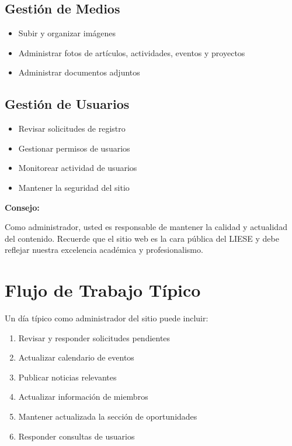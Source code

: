 \documentclass[12pt,letterpaper]{report}
\newenvironment{tip}
    {\begin{mdframed}[linecolor=tip-green,linewidth=2pt,backgroundcolor=tip-green!10]
    \textbf{Consejo:}\par}
    {\end{mdframed}}
\begin{document}
\subsection{Gestión de Medios}
\begin{itemize}
    \item Subir y organizar imágenes
    \item Administrar fotos de artículos, actividades, eventos y proyectos
    \item Administrar documentos adjuntos
\end{itemize}

\subsection{Gestión de Usuarios}
\begin{itemize}
    \item Revisar solicitudes de registro
    \item Gestionar permisos de usuarios
    \item Monitorear actividad de usuarios
    \item Mantener la seguridad del sitio
\end{itemize}

\begin{tip}
Como administrador, usted es responsable de mantener la calidad y actualidad del contenido. Recuerde que el sitio web es la cara pública del LIESE y debe reflejar nuestra excelencia académica y profesionalismo.
\end{tip}

\section{Flujo de Trabajo Típico}
Un día típico como administrador del sitio puede incluir:

\begin{enumerate}
    \item Revisar y responder solicitudes pendientes
    \item Actualizar calendario de eventos
    \item Publicar noticias relevantes
    \item Actualizar información de miembros
    \item Mantener actualizada la sección de oportunidades
    \item Responder consultas de usuarios
\end{enumerate}
\end{document}
